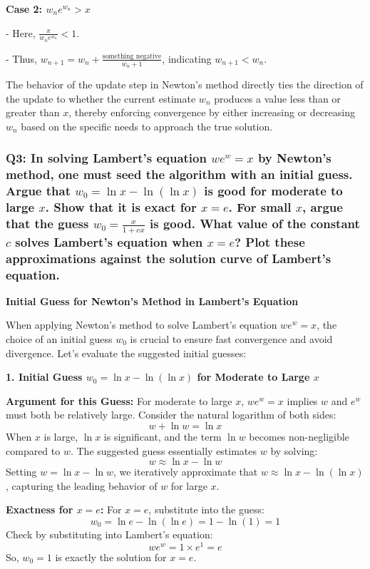 \documentclass{article}
\begin{document}
\textbf{Case 2: \(w_n e^{w_n} > x\)}

- Here, \(\frac{x}{w_n e^{w_n}} < 1\).

- Thus, \(w_{n+1} = w_n + \frac{\text{something negative}}{w_n + 1}\), indicating \(w_{n+1} < w_n\).

The behavior of the update step in Newton’s method directly ties the direction of the update to whether the current estimate \(w_n\) produces a value less than or greater than \(x\), thereby enforcing convergence by either increasing or decreasing \(w_n\) based on the specific needs to approach the true solution.

\subsubsection*{Q3: In solving Lambert’s equation \(we^w = x\) by Newton’s method, one must seed the algorithm with an initial guess. Argue that \(w_0 = \ln x - \ln(\ln x)\) is good for moderate to large \(x\). Show that it is exact for \(x = e\). For small \(x\), argue that the guess \(w_0 = \frac{x}{1 + cx}\) is good. What value of the constant \(c\) solves Lambert’s equation when \(x = e\)? Plot these approximations against the solution curve of Lambert’s equation.}

\textbf{Initial Guess for Newton's Method in Lambert's Equation}

When applying Newton's method to solve Lambert's equation \(we^w = x\), the choice of an initial guess \(w_0\) is crucial to ensure fast convergence and avoid divergence. Let's evaluate the suggested initial guesses:

\textbf{1. Initial Guess \(w_0 = \ln x - \ln(\ln x)\) for Moderate to Large \(x\)}

\textbf{Argument for this Guess:}
For moderate to large \(x\), \(we^w = x\) implies \(w\) and \(e^w\) must both be relatively large. Consider the natural logarithm of both sides:
\[ w + \ln w = \ln x \]
When \(x\) is large, \(\ln x\) is significant, and the term \(\ln w\) becomes non-negligible compared to \(w\). The suggested guess essentially estimates \(w\) by solving:
\[ w \approx \ln x - \ln w \]
Setting \(w = \ln x - \ln w\), we iteratively approximate that \(w \approx \ln x - \ln(\ln x)\), capturing the leading behavior of \(w\) for large \(x\).

\textbf{Exactness for \(x = e\):}
For \(x = e\), substitute into the guess:
\[ w_0 = \ln e - \ln(\ln e) = 1 - \ln(1) = 1 \]
Check by substituting into Lambert's equation:
\[ we^w = 1 \times e^1 = e \]
So, \(w_0 = 1\) is exactly the solution for \(x = e\).
\end{document}
